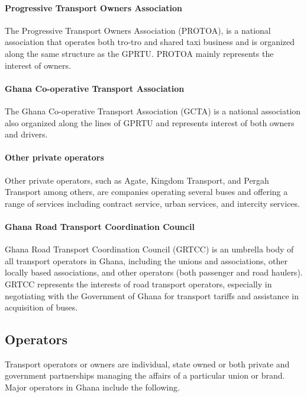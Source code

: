 \paragraph{Progressive Transport Owners Association}
The Progressive Transport Owners Association (PROTOA), is a national association that operates both tro-tro and shared taxi business and is organized along the same structure as the GPRTU. PROTOA mainly represents the interest of owners. 

\paragraph{Ghana Co-operative Transport Association}
The Ghana Co-operative Transport Association (GCTA) is a national association also organized along the lines of GPRTU and represents interest of both owners and drivers.

\paragraph{Other private operators}
Other private operators, such as Agate, Kingdom Transport, and Pergah Transport among others, are companies operating several buses and offering a range of services including contract service, urban services, and intercity services.

\paragraph{Ghana Road Transport Coordination Council}
Ghana Road Transport Coordination Council (GRTCC) is an umbrella body of all transport operators in Ghana, including the unions and associations, other locally based associations, and other operators (both passenger and road haulers). GRTCC represents the interests of road transport operators, especially in negotiating with the Government of Ghana for transport tariffs and assistance in acquisition of buses.

\subsection{Operators}
Transport operators or owners are individual, state owned or both private and government partnerships managing the affairs of a particular union or brand. Major operators in Ghana include the following.

